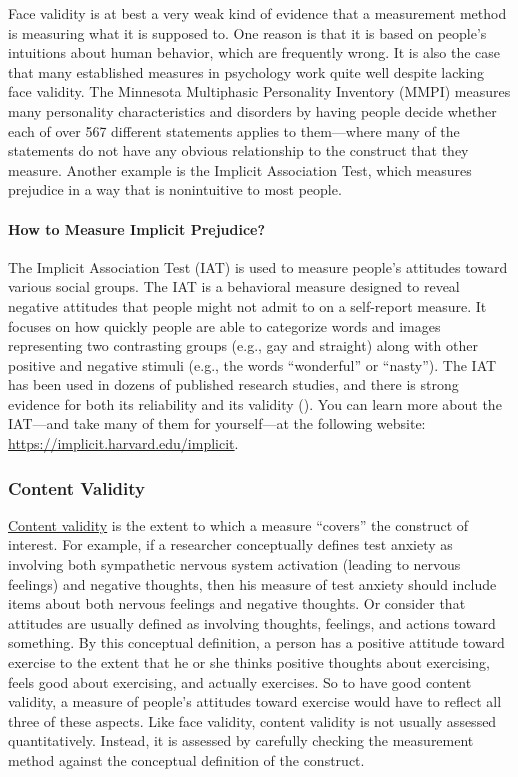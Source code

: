 \documentclass[
]{krantz}
\begin{document}
Face validity is at best a very weak kind of evidence that a measurement method is measuring what it is supposed to. One reason is that it is based on people's intuitions about human behavior, which are frequently wrong. It is also the case that many established measures in psychology work quite well despite lacking face validity. The Minnesota Multiphasic Personality Inventory (MMPI) measures many personality characteristics and disorders by having people decide whether each of over 567 different statements applies to them---where many of the statements do not have any obvious relationship to the construct that they measure. Another example is the Implicit Association Test, which measures prejudice in a way that is nonintuitive to most people.

\paragraph*{How to Measure Implicit Prejudice?}\label{how-to-measure-implicit-prejudice}

The Implicit Association Test (IAT) is used to measure people's attitudes toward various social groups. The IAT is a behavioral measure designed to reveal negative attitudes that people might not admit to on a self-report measure. It focuses on how quickly people are able to categorize words and images representing two contrasting groups (e.g., gay and straight) along with other positive and negative stimuli (e.g., the words ``wonderful'' or ``nasty''). The IAT has been used in dozens of published research studies, and there is strong evidence for both its reliability and its validity (). You can learn more about the IAT---and take many of them for yourself---at the following website: \url{https://implicit.harvard.edu/implicit}.

\subsubsection*{Content Validity}\label{content-validity}


\hyperref[content-validity]{Content validity} is the extent to which a measure ``covers'' the construct of interest. For example, if a researcher conceptually defines test anxiety as involving both sympathetic nervous system activation (leading to nervous feelings) and negative thoughts, then his measure of test anxiety should include items about both nervous feelings and negative thoughts. Or consider that attitudes are usually defined as involving thoughts, feelings, and actions toward something. By this conceptual definition, a person has a positive attitude toward exercise to the extent that he or she thinks positive thoughts about exercising, feels good about exercising, and actually exercises. So to have good content validity, a measure of people's attitudes toward exercise would have to reflect all three of these aspects. Like face validity, content validity is not usually assessed quantitatively. Instead, it is assessed by carefully checking the measurement method against the conceptual definition of the construct.
\end{document}
